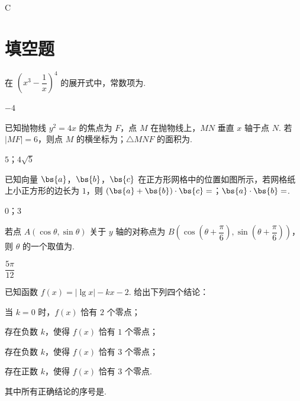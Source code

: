 \begin{answer}
C
\end{answer}

\section{填空题}

\begin{problem}
在 \(\left(x^3-\dfrac{1}{x}\right)^4\) 的展开式中，常数项为\fillinblank{}.
\end{problem}

\begin{answer}
\(-4\)
\end{answer}

\begin{problem}
已知抛物线 \(y^2=4x\) 的焦点为 \(F\)，点 \(M\) 在抛物线上，\(MN\) 垂直 \(x\) 轴于点 \(N\). 若 \(|MF|=6\)，则点 \(M\) 的横坐标为\fillinblank{}；\(\triangle MNF\) 的面积为\fillinblank{}.
\end{problem}

\begin{answer}
\(5\)；\(4\sqrt5\)
\end{answer}

\begin{problem}
已知向量 \(\bs{a}\)，\(\bs{b}\)，\(\bs{c}\) 在正方形网格中的位置如图所示，若网格纸上小正方形的边长为 \(1\)，则 \((\bs{a}+\bs{b})\cdot\bs{c}=\)\fillinblank{}；\(\bs{a}\cdot\bs{b}=\)\fillinblank{}.

\end{problem}

\begin{answer}
\(0\)；\(3\)
\end{answer}

\begin{problem}
若点 \(A(\cos\theta,\sin\theta)\) 关于 \(y\) 轴的对称点为 \(B\left(\cos\left(\theta+\dfrac{\pi}{6}\right),\sin\left(\theta+\dfrac{\pi}{6}\right)\right)\)，则 \(\theta\) 的一个取值为\fillinblank{}.
\end{problem}

\begin{answer}
\(\dfrac{5\pi}{12}\)
\end{answer}

\begin{problem}
已知函数 \(f(x)=|\lg x|-kx-2\). 给出下列四个结论：

\begin{circlelist}
\item 当 \(k=0\) 时，\(f(x)\) 恰有 \(2\) 个零点；

\item 存在负数 \(k\)，使得 \(f(x)\) 恰有 \(1\) 个零点；

\item 存在负数 \(k\)，使得 \(f(x)\) 恰有 \(3\) 个零点；

\item 存在正数 \(k\)，使得 \(f(x)\) 恰有 \(3\) 个零点.
\end{circlelist}

其中所有正确结论的序号是\fillinblank{}.
\end{problem}

